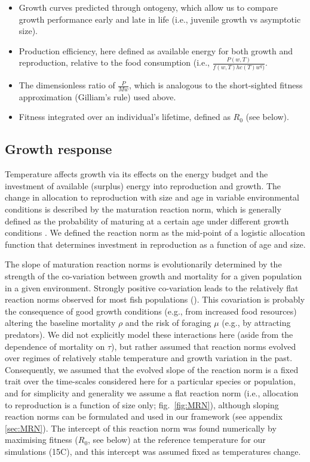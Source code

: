 \documentclass[11pt]{article}\usepackage[]{graphicx}\usepackage[]{color,soul}
\begin{document}
\begin{itemize}

\item Growth curves predicted through ontogeny, which allow us to compare growth performance early and late in life (i.e., juvenile growth vs asymptotic size).
\item Production efficiency, here defined as available energy for both growth and reproduction, relative to the food consumption (i.e., $\frac{P(w,T)}{f(w,T)h c(T) w^q)}$.
\item The dimensionless ratio of $\frac{P}{Mw}$, which is analogous to the short-sighted fitness approximation (Gilliam's rule) used above.
\item Fitness integrated over an individual's lifetime, defined as $R_0$ (see below).

\end{itemize}

\subsection*{Growth response}

Temperature affects growth via its effects on the energy budget and the investment of available (surplus) energy into reproduction and growth. The change in allocation to reproduction with size and age in variable environmental conditions is described by the maturation reaction norm, which is generally defined as the probability of maturing at a certain age under different growth conditions \cite[e.g., ][]{dieckmann_probabilistic_2007}. We defined the reaction norm as the mid-point of a logistic allocation function that determines investment in reproduction as a function of age and size. 

The slope of maturation reaction norms is evolutionarily determined by the strength of the co-variation between growth and mortality for a given population in a given environment. Strongly positive co-variation leads to the relatively flat reaction norms observed for most fish populations (\citealt{marty_impact_2011}). This covariation is probably the consequence of good growth conditions (e.g., from increased food resources) altering the baseline mortality $\rho$ and the risk of foraging $\mu$ (e.g., by attracting predators). We did not explicitly model these interactions here (aside from the dependence of mortality on $\tau$), but rather assumed that reaction norms evolved over regimes of relatively stable temperature and growth variation in the past. Consequently, we assumed that the evolved slope of the reaction norm is a fixed trait over the time-scales considered here for a particular species or population, and for simplicity and generality we assume a flat reaction norm (i.e., allocation to reproduction is a function of size only; fig.~\ref{fig:MRN}), although sloping reaction norms can be formulated and used in our framework (see appendix \ref{sec:MRN}). The intercept of this reaction norm was found numerically by maximising fitness ($R_0$, see below) at the reference temperature for our simulations (15\degree C), and this intercept was assumed fixed as temperatures change.
\end{document}
